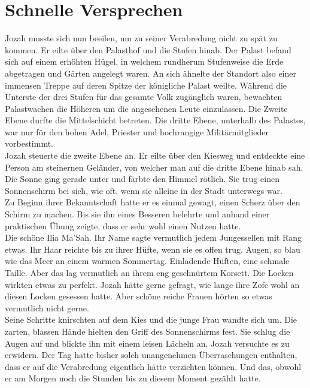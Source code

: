 \chapter{Schnelle Versprechen}

Jozah musste sich nun beeilen, um zu seiner Verabredung nicht zu spät zu kommen. Er eilte über den 
Palasthof und die Stufen hinab. Der Palast befand sich auf einem erhöhten Hügel, in welchem 
rundherum Stufenweise die Erde abgetragen und Gärten angelegt waren. An sich ähnelte der Standort 
also einer immensen Treppe auf deren Spitze der königliche Palast weilte. Während die Unterste der 
drei Stufen für das gesamte Volk zugänglich waren, bewachten Palastwachen die Höheren um die 
angesehenen Leute einzulassen. Die Zweite Ebene durfte die Mittelschicht betreten. Die dritte Ebene, 
unterhalb des Palastes, war nur für den hohen Adel, Priester und hochrangige Militärmitglieder 
vorbestimmt.\\
Jozah steuerte die zweite Ebene an. Er eilte über den Kiesweg und entdeckte eine Person am 
steinernen Geländer, von welcher man auf die dritte Ebene hinab sah. Die Sonne ging gerade unter und 
färbte den Himmel rötlich. Sie trug einen Sonnenschirm bei sich, wie oft, wenn sie alleine in der 
Stadt unterwegs war.\\
Zu Beginn ihrer Bekanntschaft hatte er es einmal gewagt, einen Scherz über den Schirm zu machen. 
Bis sie ihn eines Besseren belehrte und anhand einer praktischen Übung zeigte, dass er sehr wohl 
einen Nutzen hatte.\\
Die schöne Ilia Ma'Sah. Ihr Name sagte vermutlich jedem Jungessellen mit Rang etwas. Ihr Haar 
reichte bis zu ihrer Hüfte, wenn sie es offen trug. Augen, so blau wie das Meer an einem warmen 
Sommertag. Einladende Hüften, eine schmale Taille. Aber das lag vermutlich an ihrem eng geschnürtem 
Korsett. Die Locken wirkten etwas zu perfekt. Jozah hätte gerne gefragt, wie lange ihre Zofe wohl an 
diesen Locken gesessen hatte. Aber schöne reiche Frauen hörten so etwas vermutlich nicht gerne.\\
Seine Schritte knirschten auf dem Kies und die junge Frau wandte sich um. Die zarten, blassen Hände 
hielten den Griff des Sonnenschirms fest. Sie schlug die Augen auf und blickte ihn mit einem leisen 
Lächeln an. Jozah versuchte es zu erwidern. Der Tag hatte bisher solch unangenehmen Überraschungen 
enthalten, dass er auf die Verabredung eigentlich hätte verzichten können. Und das, obwohl er am 
Morgen noch die Stunden bis zu diesem Moment gezählt hatte.\\

